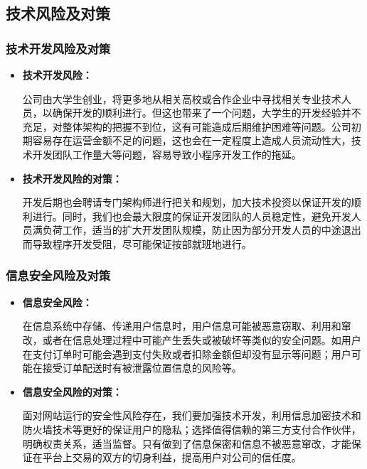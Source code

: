\documentclass[UTF8,12pt]{ctexart}
\numberwithin{figure}{section}%
\begin{document}
\begin{spacing}{2}
\subsection{技术风险及对策}
\subsubsection{技术开发风险及对策}

\begin{itemize}
	\item \textbf{技术开发风险：}
	
	公司由大学生创业，将更多地从相关高校或合作企业中寻找相关专业技术人员，以确保开发的顺利进行。但这也带来了一个问题，大学生的开发经验并不充足，对整体架构的把握不到位，这有可能造成后期维护困难等问题。公司初期容易存在运营金额不足的问题，这也会在一定程度上造成人员流动性大，技术开发团队工作量大等问题，容易导致小程序开发工作的拖延。
	
	\item \textbf{技术开发风险的对策：}
	
	开发后期也会聘请专门架构师进行把关和规划，加大技术投资以保证开发的顺利进行。同时，我们也会最大限度的保证开发团队的人员稳定性，避免开发人员满负荷工作，适当的扩大开发团队规模，防止因为部分开发人员的中途退出而导致程序开发受阻，尽可能保证按部就班地进行。
	
\end{itemize}

\subsubsection{信息安全风险及对策}

\begin{itemize}
	\item \textbf{信息安全风险：}
	
	在信息系统中存储、传递用户信息时，用户信息可能被恶意窃取、利用和窜改，或者在信息处理过程中可能产生丢失或被破坏等类似的安全问题。如用户在支付订单时可能会遇到支付失败或者扣除金额但却没有显示等问题；用户可能在接受订单配送时有被泄露位置信息的风险等。
	
	\item \textbf{信息安全风险的对策：}
	
	面对网站运行的安全性风险存在，我们要加强技术开发，利用信息加密技术和防火墙技术等更好的保证用户的隐私；选择值得信赖的第三方支付合作伙伴，明确权责关系，适当监督。只有做到了信息保密和信息不被恶意窜改，才能保证在平台上交易的双方的切身利益，提高用户对公司的信任度。
	
\end{itemize}

\end{spacing}
\end{document}
